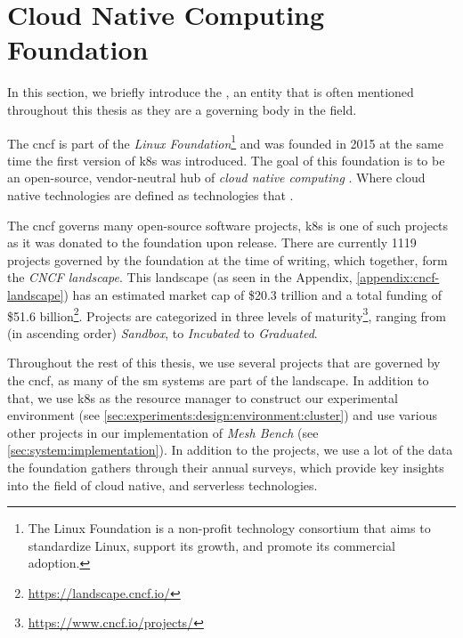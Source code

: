 \section{Cloud Native Computing Foundation}
\label{sec:background:cncf}


In this section, we briefly introduce the , an entity that is often mentioned throughout this thesis as they are a governing body in the field. 

The \gls{cncf} is part of the \textit{Linux Foundation}\footnote{The Linux Foundation  is a non-profit technology consortium that aims to standardize Linux, support its growth, and promote its commercial adoption.} and was founded in 2015 at the same time the first version of \gls{k8s} was introduced. The goal of this foundation is to be an open-source, vendor-neutral hub of \textit{cloud native computing} \cite{cncf-who-are-we}. Where cloud native technologies are defined as technologies that .

The \gls{cncf} governs many open-source software projects, \gls{k8s} is one of such projects as it was donated to the foundation upon release. There are currently 1119 projects governed by the foundation at the time of writing, which together, form the \textit{CNCF landscape}. This landscape (as seen in the Appendix, \cref{appendix:cncf-landscape}) has an estimated market cap of \$20.3 trillion and a total funding of \$51.6 billion\footnote{\url{https://landscape.cncf.io/}}. Projects are categorized in three levels of maturity\footnote{\url{https://www.cncf.io/projects/}}, ranging from (in ascending order) \textit{Sandbox}, to \textit{Incubated} to \textit{Graduated}.

Throughout the rest of this thesis, we use several projects that are governed by the \gls{cncf}, as many of the \gls{sm} systems are part of the landscape. In addition to that, we use \gls{k8s} as the resource manager to construct our experimental environment (see \cref{sec:experiments:design:environment:cluster}) and use various other projects in our implementation of \textit{Mesh Bench} (see \cref{sec:system:implementation}). In addition to the projects, we use a lot of the data the foundation gathers through their annual surveys, which provide key insights into the field of cloud native, and serverless technologies.
 